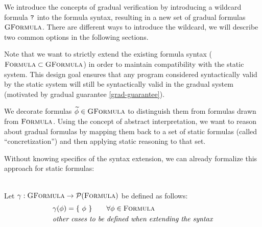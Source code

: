
We introduce the concepts of gradual verification by introducing a wildcard formula $\texttt{?}$ into the formula syntax, resulting in a new set of gradual formulas $\textsc{GFormula}$.
There are different ways to introduce the wildcard, we will describe two common options in the following sections.

Note that we want to strictly extend the existing formula syntax ($\textsc{Formula} \subset \textsc{GFormula}$) in order to maintain compatibility with the static system.
This design goal ensures that any program considered syntactically valid by the static system will still be syntactically valid in the gradual system (motivated by gradual guarantee \ref{grad-guarantee}).

We decorate formulas $\widetilde{\phi} \in \textsc{GFormula}$ to distinguish them from formulas drawn from $\textsc{Formula}$.
Using the concept of abstract interpretation, we want to reason about gradual formulas by mapping them back to a set of static formulas (called “concretization”) and then applying static reasoning to that set.


Without knowing specifics of the syntax extension, we can already formalize this approach for static formulas:
\begin{definition}[Concretization]~\\
    Let $\gamma : \textsc{GFormula} \rightarrow \mathcal{P}(\textsc{Formula})$ be defined as follows:
    \begin{align*}
    &\gamma(\phi) = \{~ \phi ~\}     \quad\quad \forall \phi \in \textsc{Formula}\\
    &\textit{other cases to be defined when extending the syntax}
    \end{align*}
\end{definition}

